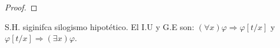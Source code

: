 \documentclass[12pt]{report}
\theoremstyle{largebreak}
\begin{document}
\begin{proof}
    \end{proof}

    \begin{obs}
        S.H. siginifca silogismo hipotético. El I.U y G.E son:
        $(\forall x)\varphi\Rightarrow \varphi[t/x]$ y $\varphi[t/x]\Rightarrow (\exists x)\varphi$.
    \end{obs}
\end{document}
